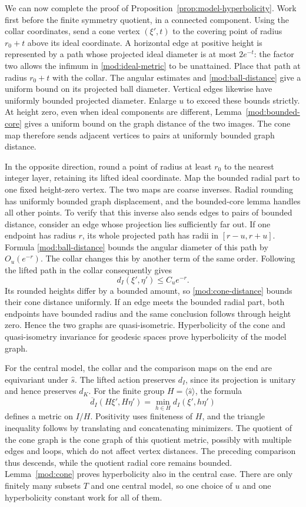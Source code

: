 We can now complete the proof of
Proposition~\ref{prop:model-hyperbolicity}.  Work first before the
finite symmetry quotient, in a connected component.  Using the
collar coordinates, send a cone vertex $(\xi',t)$ to the covering
point of radius $r_0+t$ above its ideal coordinate.  A horizontal
edge at positive height is represented by a path whose projected
ideal diameter is at most $2e^{-t}$: the factor two allows the
infimum in \eqref{mod:ideal-metric} to be unattained.  Place that
path at radius $r_0+t$ with the collar.  The angular estimates and
\eqref{mod:ball-distance} give a uniform bound on its projected
ball diameter.  Vertical edges likewise have uniformly bounded
projected diameter.  Enlarge $u$ to exceed these bounds strictly.
At height zero, even when ideal components are different,
Lemma~\ref{mod:bounded-core} gives a uniform bound on the graph
distance of the two images.  The cone map therefore sends adjacent
vertices to pairs at uniformly bounded graph distance.

In the opposite direction, round a point of radius at least $r_0$
to the nearest integer layer, retaining its lifted ideal coordinate.
Map the bounded radial part to one fixed height-zero vertex.
The two maps are coarse inverses.  Radial rounding has uniformly
bounded graph displacement, and the bounded-core lemma handles
all other points.  To verify that this inverse also sends edges
to pairs of bounded distance, consider an edge whose projection
lies sufficiently far out.  If one endpoint has radius $r$, its
whole projected path has radii in $[r-u,r+u]$.  Formula
\eqref{mod:ball-distance} bounds the angular diameter of this path
by $O_u(e^{-r})$.  The collar changes this by another term of the
same order.  Following the lifted path in the collar consequently
gives
\[
 d_I(\xi',\eta')\le C_u e^{-r}.
\]
Its rounded heights differ by a bounded amount, so
\eqref{mod:cone-distance} bounds their cone distance uniformly.
If an edge meets the bounded radial part, both endpoints have
bounded radius and the same conclusion follows through height
zero.  Hence the two graphs are quasi-isometric.  Hyperbolicity
of the cone and quasi-isometry invariance for geodesic spaces
\cite[Chapter~III.H]{BridsonHaefliger} prove hyperbolicity of the
model graph.

For the central model, the collar and the comparison maps on the
end are equivariant under $\widehat s$.  The lifted action preserves
$d_I$, since its projection is unitary and hence preserves $d_K$.
For the finite group $H=\langle\widehat s\rangle$, the formula
\[
 \overline d_I(H\xi',H\eta')
   =\min_{h\in H}d_I(\xi',h\eta')
\]
defines a metric on $I/H$.  Positivity uses finiteness of $H$, and
the triangle inequality follows by translating and concatenating
minimizers.  The quotient of the cone graph is the cone graph of this quotient
metric, possibly with multiple edges and loops, which do not affect
vertex distances.
The preceding comparison thus descends, while the quotient radial
core remains bounded.  Lemma~\ref{mod:cone} proves hyperbolicity
also in the central case.  There are only finitely many subsets
$T$ and one central model, so one choice of $u$ and one
hyperbolicity constant work for all of them.

